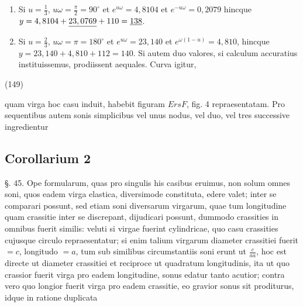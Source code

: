 \documentclass[11pt,a4paper]{article}
\begin{document}
\begin{enumerate}
\item[I.] Si $u=\frac{1}{3}$, $u\omega=\frac{\pi}{2}=90^{\circ}$ et $e^{u\omega}=4,8104$ et $e^{-u\omega}=0,2079$
hincque $y=4,8104+\uncertain{23,0769}+110=\uncertain{138}$.
\item[II] Si $u=\frac{2}{3}$, $u\omega=\pi=180^{\circ}$ et $e^{u\omega}=23,140$ et $e^{\omega(1-u)}=4,810$,
hincque $y=23,140+4,810+112=140$. Si autem duo valores, si
calculum accuratius instituissemus, prodiissent aequales. Curva igitur,
\end{enumerate}

(149)

quam virga hoc casu induit, habebit figuram $ErsF$, fig. 4 repraesentatam.
Pro sequentibus autem sonis simplicibus vel unus nodus, vel duo, vel tres
successive ingredientur

\subsection{Corollarium 2}

§. 45. Ope formularum, quas pro singulis his casibus eruimus, non
solum omnes soni, quos eadem virga elastica, diversimode constituta,
edere valet; inter se comparari possunt, sed etiam soni diversarum
virgarum, quae tum longitudine quam crassitie inter se discrepant, dijudicari possunt, dummodo crassities in omnibus fuerit
similis: veluti si virgae fuerint cylindricae, quo casu crassities
cujusque circulo repraesentatur; si enim talium virgarum diameter
crassitiei fuerit $=c$, longitudo $=a$, tum sub similibus circumstantiis
soni erunt ut $\frac{c}{aa}$, hoc est directe ut diameter crassitiei et
reciproce ut quadratum longitudinis, ita ut quo crassior fuerit virga
pro eadem longitudine, sonus edatur tanto acutior; contra vero
quo longior fuerit virga pro eadem crassitie, eo gravior sonus
sit proditurus, idque in ratione duplicata
\end{document}

